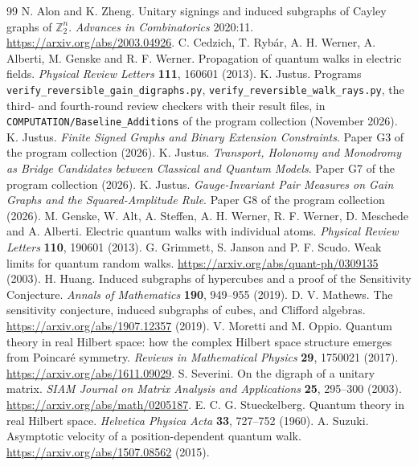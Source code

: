 \documentclass[11pt,a4paper]{article}
\begin{document}
\setcounter{page}{2}

\clearpage
\begin{thebibliography}{99}
 N. Alon and K. Zheng. Unitary signings and induced subgraphs of Cayley graphs of $\mathbb{Z}_2^n$. \emph{Advances in Combinatorics} 2020:11. \url{https://arxiv.org/abs/2003.04926}.
 C. Cedzich, T. Ryb\'ar, A. H. Werner, A. Alberti, M. Genske and R. F. Werner. Propagation of quantum walks in electric fields. \emph{Physical Review Letters} \textbf{111}, 160601 (2013).
 K. Justus. Programs \texttt{verify\_reversible\_gain\_digraphs.py}, \texttt{verify\_reversible\_walk\_rays.py}, the third- and fourth-round review checkers with their result files, in \texttt{COMPUTATION/Baseline\_Additions} of the program collection (November 2026).
 K. Justus. \emph{Finite Signed Graphs and Binary Extension Constraints}. Paper G3 of the program collection (2026).
 K. Justus. \emph{Transport, Holonomy and Monodromy as Bridge Candidates between Classical and Quantum Models}. Paper G7 of the program collection (2026).
 K. Justus. \emph{Gauge-Invariant Pair Measures on Gain Graphs and the Squared-Amplitude Rule}. Paper G8 of the program collection (2026).
 M. Genske, W. Alt, A. Steffen, A. H. Werner, R. F. Werner, D. Meschede and A. Alberti. Electric quantum walks with individual atoms. \emph{Physical Review Letters} \textbf{110}, 190601 (2013).
 G. Grimmett, S. Janson and P. F. Scudo. Weak limits for quantum random walks. \url{https://arxiv.org/abs/quant-ph/0309135} (2003).
 H. Huang. Induced subgraphs of hypercubes and a proof of the Sensitivity Conjecture. \emph{Annals of Mathematics} \textbf{190}, 949--955 (2019).
 D. V. Mathews. The sensitivity conjecture, induced subgraphs of cubes, and Clifford algebras. \url{https://arxiv.org/abs/1907.12357} (2019).
 V. Moretti and M. Oppio. Quantum theory in real Hilbert space: how the complex Hilbert space structure emerges from Poincar\'e symmetry. \emph{Reviews in Mathematical Physics} \textbf{29}, 1750021 (2017). \url{https://arxiv.org/abs/1611.09029}.
 S. Severini. On the digraph of a unitary matrix. \emph{SIAM Journal on Matrix Analysis and Applications} \textbf{25}, 295--300 (2003). \url{https://arxiv.org/abs/math/0205187}.
 E. C. G. Stueckelberg. Quantum theory in real Hilbert space. \emph{Helvetica Physica Acta} \textbf{33}, 727--752 (1960).
 A. Suzuki. Asymptotic velocity of a position-dependent quantum walk. \url{https://arxiv.org/abs/1507.08562} (2015).
\end{thebibliography}
\end{document}
